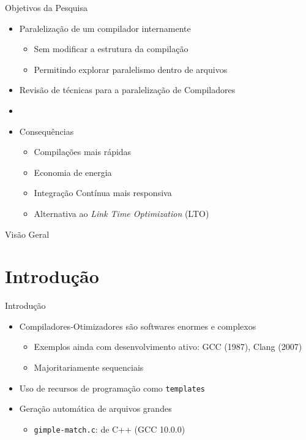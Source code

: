 \customtitlepage


\begin{frame}{Objetivos da Pesquisa}
    \begin{itemize}
        \item Paralelização de um compilador internamente
        \begin{itemize}
            \item Sem modificar a estrutura da compilação
            \item Permitindo explorar paralelismo dentro de arquivos
        \end{itemize}
        \item Revisão de técnicas para a paralelização de Compiladores
        \item[]
        \item Consequências
        \begin{itemize}
            \item Compilações mais rápidas
            \item Economia de energia
            \item Integração Contínua mais responsiva
            \item Alternativa ao \textit{Link Time Optimization} (LTO)
        \end{itemize}
    \end{itemize}
\end{frame}

\begin{frame}{Visão Geral}
  \overview
\end{frame}

\section{Introdução}

\begin{frame}{Introdução}
  \begin{itemize}
    \item Compiladores-Otimizadores são softwares enormes e complexos
        \begin{itemize}
            \item Exemplos ainda com desenvolvimento ativo: GCC (1987), Clang (2007)
            \item Majoritariamente sequenciais
        \end{itemize}
    \item Uso de recursos de programação como \texttt{templates}
    \item Geração automática de arquivos grandes
        \begin{itemize}
            \item \texttt{gimple-match.c}: {\color{red}{100358 linhas}} de C++ (GCC 10.0.0)
        \end{itemize}
  \end{itemize}
\end{frame}



